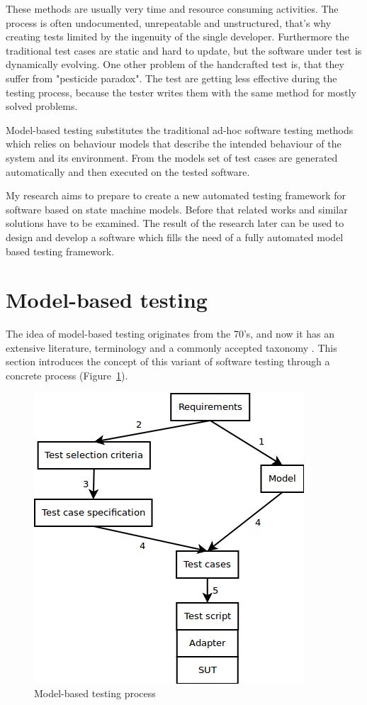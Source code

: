 \documentclass{article}
\begin{document}
These methods are usually very time and resource consuming activities. The process is often undocumented, unrepeatable and unstructured, that's why creating tests limited by the ingenuity of the single developer. Furthermore the traditional test cases are static and hard to update, but the software under test is dynamically evolving. One other problem of the handcrafted test is, that they suffer from "pesticide paradox". The test are getting less effective during the testing process, because the tester writes them with the same method for mostly solved problems.

Model-based testing substitutes the traditional ad-hoc software testing methods which relies on behaviour models that describe the intended behaviour of the system and its environment. From the models set of test cases are generated automatically and then executed on the tested software.

My research aims to prepare to create a new automated testing framework for software based on state machine models. Before that related works and similar solutions have to be examined. The result of the research later can be used to design and develop a software which fills the need of a fully automated model based testing framework.


\section{Model-based testing}
\label{sec:mbt}

The idea of model-based testing originates from the 70's, and now it has an extensive literature, terminology and a commonly accepted taxonomy \cite{taxonomy}. This section introduces the concept of this variant of software testing through a concrete process (Figure~\ref{fig:mbtprocess}).

\begin{figure}[htp]
\centering
\includegraphics[scale=0.6]{img/mbt_process.png}
\caption{Model-based testing process}
\label{fig:mbtprocess}
\end{figure}
\end{document}
